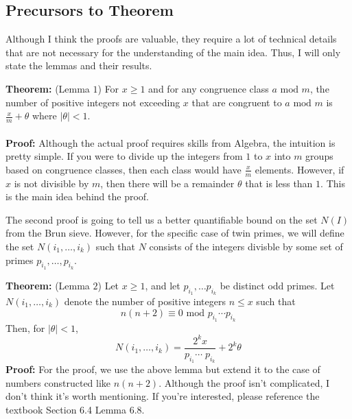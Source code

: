 \documentclass[8pt]{extarticle}
\begin{document}
\subsection{Precursors to Theorem}
Although I think the proofs are valuable, they require a lot of technical details that are not necessary for the understanding of the main idea. Thus, I will only state the lemmas and their results.
\begin{boxedsection}
    \textbf{Theorem:} (Lemma $1$) For $x \geq 1$ and for any congruence class $a \text{ mod } m$, the number of positive integers not exceeding $x$ that are congruent to $a \text{ mod } m$ is $\frac{x}{m} + \theta$ where $|\theta| < 1$. \\
    \\
    \textbf{Proof:} Although the actual proof requires skills from Algebra, the intuition is pretty simple. If you were to divide up the integers from $1$ to $x$ into $m$ groups based on congruence classes, then each class would have $\frac{x}{m}$ elements. However, if $x$ is not divisible by $m$, then there will be a remainder $\theta$ that is less than $1$. This is the main idea behind the proof.
\end{boxedsection}
The second proof is going to tell us a better quantifiable bound on the set $N(I)$ from the Brun sieve. However, for the specific case of twin primes, we will define the set $N(i_1, \dots, i_k)$ such that $N$ consists of the integers divisble by some set of primes $p_{i_1}, \dots, p_{i_k}$.
\begin{boxedsection}
    \textbf{Theorem:} (Lemma $2$) Let $x \geq 1$, and let $p_{i_1}, \dots p_{i_k}$ be distinct odd primes. Let $N(i_1, \dots, i_k)$ denote the number of positive integers $n \leq x$ such that
    $$
    n(n+2) \equiv 0 \text{ mod } p_{i_1} \cdots p_{i_k}
    $$
    Then, for $|\theta| < 1$,
    $$
    N(i_1, \dots, i_k) = \frac{2^k x}{p_{i_1} \cdots \;p_{i_k}} + 2^k\theta
    $$
    \textbf{Proof:} For the proof, we use the above lemma but extend it to the case of numbers constructed like $n(n+2)$. Although the proof isn't complicated, I don't think it's worth mentioning. If you're interested, please reference the textbook Section 6.4 Lemma 6.8.
\end{boxedsection}
\end{document}

